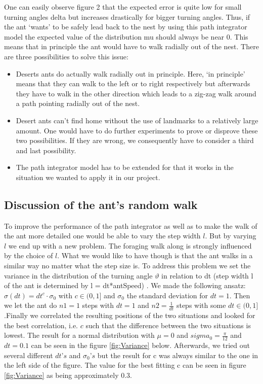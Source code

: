 \documentclass[11pt]{article}
\begin{document}
One can easily observe figure 2 that the expected error is quite low for small turning angles delta but increases drastically for bigger turning angles. Thus, if the ant ‘wants’ to be safely lead back to the nest by using this path integrator model the expected value of the distribution mu should always be near 0. This means that in principle the ant would have to walk radially out of the nest. There are three possibilities to solve this issue:
\begin{itemize}
\item Deserts ants do actually walk radially out in principle. Here, ‘in principle’ means that they can walk to the left or to right respectively but afterwards they have to walk in the other direction which leads to a zig-zag walk around a path pointing radially out of the nest. 
\item Desert ants can’t find home without the use of landmarks to a relatively large amount.
One would have to do further experiments to prove or disprove these two possibilities. If they are wrong, we consequently have to consider a third and last possibility.
\item The path integrator model has to be extended for that it works in the situation we wanted to apply it in our project.
\end{itemize}

\subsection{Discussion of the ant's random walk}
To improve the performance of the path integrator as well as to make the walk of the ant more detailed one would be able to vary the step width $l$. 
But by varying $l$ we end up with a new problem. The foraging walk along is strongly influenced by the choice of $l$. What we would like to have though is that the ant walks in a similar way no matter what the step size is. 
To address this problem we set the variance in the distribution of the turning angle $\vartheta$ in relation to dt (step width l of the ant is determined by l = dt*antSpeed) . 
We made the following ansatz: $\sigma(dt) = dt^{c} \cdot \sigma_{0}$ with $c \in (0,1]$ and $\sigma_{0}$ the standard deviation for $dt = 1$.
Then we let the ant do $n1=1$ steps with $dt=1$ and $n2=\frac{1}{dt}$ steps with some $dt \in (0,1]$.Finally we correlated the resulting positions of the two situations and looked for the best correlation, i.e. $c$ such that the difference between the two situations is lowest. 
The result for a normal distribution with $\mu = 0$ and $sigma_{0} = \frac{\pi}{12}$ and $dt = 0.1$ can be seen in the figure \ref{fig:Variance} below.
Afterwards, we tried out several different $dt’s$ and $\sigma_{0}’s$ but the result for c was always similar to the one in the left side of the figure. The value for the best fitting c can be seen in figure \ref{fig:Variance} as being approximately 0.3.  
\end{document}
